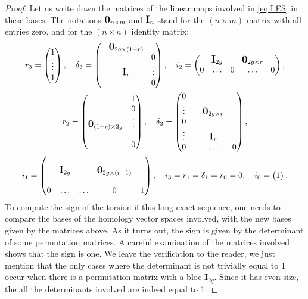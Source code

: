 \documentclass[JEP,XML,SOM,Unicode,NoFloatCountersInSection,published]{cedram}
\theoremstyle{plain}
\theoremstyle{definition}
\theoremstyle{remark}
\newcommand{\bma}{\begin{pmatrix}}
\newcommand{\ema}{\end{pmatrix}}
\newcommand{\bigzero}{\mbox{\normalfont\large\bfseries 0}}
\newcommand{\bigId}{\mbox{\normalfont\large\bfseries \textrm{I}}}
\numberwithin{equation}{section}
\begin{document}
\begin{proof}
Let us write down the matrices of the linear maps involved in \cref{eq:LES} in these bases. The notations $\bigzero_{n\times m}$ and $\bigId_{n}$ stand for the $(n\times m)$ matrix with all entries zero, and for the $(n \times n)$ identity matrix:
\begin{gather*}
\arraycolsep4.5pt
r_3 = \bma 1 \\ \vdots \\ 1 \ema, \quad \delta_3 = \bma & \begin{matrix} \bigzero_{2g \times (1+r)} \end{matrix} & \\
& & 0 \\
& \begin{matrix} \bigId_r \end{matrix}& \vdots \\
& & 0
\ema,
\quad
i_2 = \bma & \bigId_{2g} & & \bigzero_{2g \times r} & \\
0 &\ldots & 0 &\ldots & 0
\ema,
\\
r_2 = \bma & 1 \\
& 0\\
\bigzero_{(1+r) \times 2g} & \vdots\\
& \\
& 0
\ema,
\quad
\delta_2 = \bma 0 & & & \\
\vdots & & \bigzero_{2g \times r} &\\
0&&& \\
\vdots & & \bigId_r&\\
0 & & \ldots &0
\ema,
\\
i_1 = \bma & & & &\\
& \bigId_{2g} & & \bigzero_{2g \times (r+1)} &\\
& & & &\\
0 &\ldots & \ldots & 0 & 1
\ema,
\quad
i_3 = r_1 = \delta_1 = r_0 = 0,
\quad
i_0 = \bma 1 \ema.
\end{gather*}
To compute the sign of the torsion if this long exact sequence, one needs to compare the bases of the homology vector spaces involved, with the new bases given by the matrices above. As it turns out, the sign is given by the determinant of some permutation matrices. A careful examination of the matrices involved shows that the sign is one. We leave the verification to the reader, we just mention that the only cases where the determinant is not trivially equal to 1 occur when there is a permutation matrix with a bloc $ \textbf{I}_{2g}$. Since it has even size, the all the determinants involved are indeed equal to 1.
\end{proof}
\end{document}
